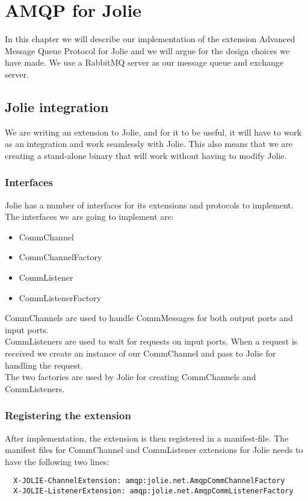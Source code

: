 \section{AMQP for Jolie}
In this chapter we will describe our implementation of the extension Advanced Message Queue Protocol for Jolie and we will argue for the design choices we have made. We use a RabbitMQ\cite{RabbitMQ} server as our message queue and exchange server.

\subsection{Jolie integration}
We are writing an extension to Jolie, and for it to be useful, it will have to work as an integration and work seamlessly with Jolie. This also means that we are creating a stand-alone binary that will work without having to modify Jolie.

\subsubsection{Interfaces}
Jolie has a number of interfaces for its extensions and protocols to implement. The interfaces we are going to implement are:
\begin{itemize}
\item CommChannel
\item CommChannelFactory
\item CommListener
\item CommListenerFactory
\end{itemize}

CommChannels are used to handle CommMessages for both output ports and input ports.\\
CommListeners are used to wait for requests on input ports. When a request is received we create an instance of our CommChannel and pass to Jolie for handling the request.\\
The two factories are used by Jolie for creating CommChannels and CommListeners.

\subsubsection{Registering the extension}
After implementation, the extension is then registered in a manifest-file. The manifest files for CommChannel and CommListener extensions for Jolie needs to have the following two lines:
\begin{lstlisting}
  X-JOLIE-ChannelExtension: amqp:jolie.net.AmqpCommChannelFactory
  X-JOLIE-ListenerExtension: amqp:jolie.net.AmqpCommListenerFactory
\end{lstlisting}

